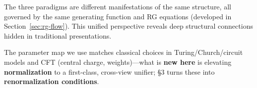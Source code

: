 The three paradigms are different manifestations of the same structure, all governed by the same generating function and RG equations (developed in Section~\ref{sec:rg-flow}). This unified perspective reveals deep structural connections hidden in traditional presentations.

The parameter map we use matches classical choices in Turing/Church/circuit models and CFT (central charge, weights)—what is \textbf{new here} is elevating \textbf{normalization} to a first-class, cross-view unifier; §3 turns these into \textbf{renormalization conditions}.